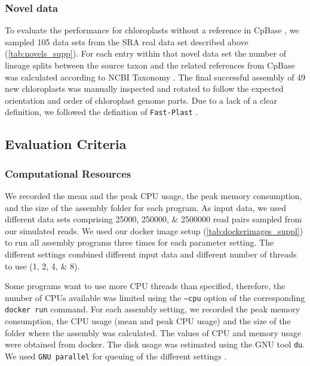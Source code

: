 \documentclass{bmcart}
\newcommand{\todo}[1]{\textcolor{red}{\bfseries(ToDO: #1})}
\newcommand{\formatprogramnames}[1]{\texttt{#1}}
\newcommand{\fp}{\formatprogramnames{Fast-Plast}}
\begin{document}
\subsubsection*{Novel data}
To evaluate the performance for chloroplasts without a reference in CpBase \cite{cpbase}, we sampled \num{105} data sets from the SRA \cite{sra2010} real data set described above (\cref{tab:novels_supp}).
For each entry within that novel data set the number of lineage splits between the source taxon and the related references from CpBase was calculated according to NCBI Taxonomy \cite{ncbitaxonomy}.
The final successful assembly of \num{49} new chloroplasts was manually inspected and rotated to follow the expected orientation and order of chloroplast genome parts.
Due to a lack of a clear definition, we followed the definition of \fp{} \cite{fastplast_orientation_issue}.

\subsection*{Evaluation Criteria}
\subsubsection*{Computational Resources}
We recorded the mean and the peak CPU usage, the peak memory consumption, and the size of the assembly folder for each program. 
As input data, we used different data sets comprising \numlist{25000;250000;2500000} read pairs sampled from  our simulated reads.
We used our docker image setup (\cref{tab:dockerimages_suppl}) to run all assembly programs three times for each parameter setting.
The different settings combined different input data and different number of threads to use (\numlist{1;2;4;8}).

Some programs want to use more CPU threads than specified, therefore, the number of CPUs available was limited using the \texttt{--cpu} option of the corresponding \texttt{docker run} command.
For each assembly setting, we recorded the peak memory consumption, the CPU usage (mean and peak CPU usage) and the size of the folder where the assembly was calculated.
The values of CPU and memory usage were obtained from docker.
The disk usage was estimated using the GNU tool \texttt{du}.
We used \texttt{GNU parallel} for queuing of the different settings \cite{Tange2011a}.
\end{document}
